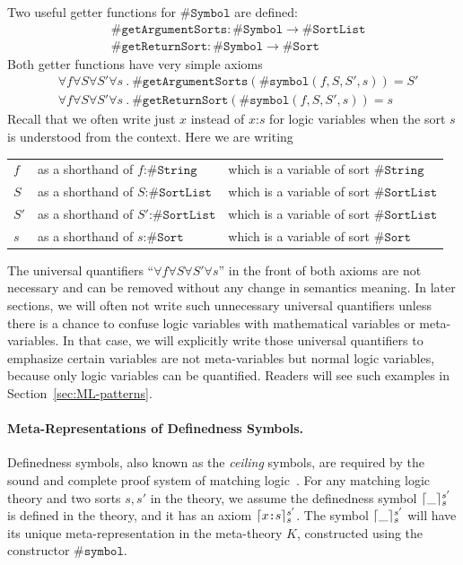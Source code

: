 \documentclass[UTF8,11pt]{article}
\theoremstyle{plain}
\theoremstyle{definition}
\theoremstyle{remark}
\DeclarePairedDelimiter{\ceil}{\lceil}{\rceil}
\newcommand{\cln}{\texttt{:}}
\newcommand{\sharpsymbol}{\#}
\newcommand{\KString}{\texttt{\sharpsymbol String}}
\newcommand{\KSort}{\texttt{\sharpsymbol Sort}}
\newcommand{\KSymbol}{\texttt{\sharpsymbol Symbol}}
\newcommand{\Ksymbol}{\texttt{\sharpsymbol symbol}}
\newcommand{\KgetArgumentSorts}{\texttt{\sharpsymbol getArgumentSorts}}
\newcommand{\KgetReturnSort}{\texttt{\sharpsymbol getReturnSort}}
\newcommand{\KSortList}{\texttt{\sharpsymbol SortList}}
\begin{document}
Two useful getter functions for $\KSymbol$ are defined:
\begin{align*}
 & \KgetArgumentSorts \colon \KSymbol \to \KSortList \\
 & \KgetReturnSort    \colon \KSymbol \to \KSort
\end{align*}
Both getter functions have very simple axioms
\begin{align*}
 & \forall f\forall S \forall S'\forall s \ .\ \KgetArgumentSorts(\Ksymbol(f, S,
 S', s)) = S'\\
 & \forall f\forall S \forall S'\forall s \ .\ \KgetReturnSort(\Ksymbol(f, S, S',
 s)) = s
\end{align*}
Recall that we often write just $x$ instead of $x \cln s$ for logic variables
when the sort $s$ is understood from the context.
Here we are writing
\begin{center}
\begin{tabular}{lll}
 $f$ & as a shorthand of $f \cln \KString$ & which is a variable of sort
 $\KString$ \\
 $S$ & as a shorthand of $S \cln \KSortList$ & which is a variable of sort
 $\KSortList$ \\
 $S'$ & as a shorthand of $S' \cln \KSortList$ & which is a variable of sort
 $\KSortList$ \\
 $s$ & as a shorthand of $s \cln \KSort$ & which is a variable of sort
 $\KSort$
\end{tabular}
\end{center}
The universal quantifiers ``$\forall f\forall S \forall S'\forall s$'' in the
front of both axioms are not necessary and can be removed without any change in
semantics meaning.
In later sections, we will often not write such unnecessary universal
quantifiers unless there is a chance to confuse logic variables with
mathematical variables or meta-variables.
In that case, we will explicitly write those universal quantifiers to emphasize
certain variables are not meta-variables but normal logic variables, because
only logic variables can be quantified.
Readers will see such examples in Section~\ref{sec:ML-patterns}.

\paragraph{Meta-Representations of Definedness Symbols.}
Definedness symbols, also known as the \emph{ceiling} symbols, are required by
the sound and complete proof system of matching logic~\cite{rosu-2017-lmcs}.
For any matching logic theory and two sorts $s, s'$ in the theory, we assume
the definedness symbol $\ceil{\_}_s^{s'}$ is defined in the theory, and it has
an axiom $\ceil{x \cln s}_s^{s'}$.
The symbol $\ceil{\_}_s^{s'}$ will have its unique meta-representation in the
meta-theory $K$, constructed using the constructor $\Ksymbol$.
\end{document}
